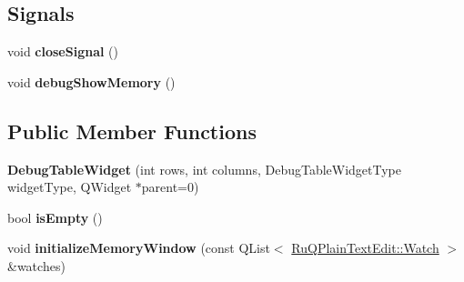 \subsection*{Signals}
\begin{DoxyCompactItemize}
\item 
\hypertarget{class_debug_table_widget_a63febd4042d44b0148fb3e3692d4423b}{}void {\bfseries close\+Signal} ()\label{class_debug_table_widget_a63febd4042d44b0148fb3e3692d4423b}

\item 
\hypertarget{class_debug_table_widget_a4ba5bb4bf0bc8ffac4fa7740cc566dc4}{}void {\bfseries debug\+Show\+Memory} ()\label{class_debug_table_widget_a4ba5bb4bf0bc8ffac4fa7740cc566dc4}

\end{DoxyCompactItemize}
\subsection*{Public Member Functions}
\begin{DoxyCompactItemize}
\item 
\hypertarget{class_debug_table_widget_a72e7b44f66614eb549fe23486c885c57}{}{\bfseries Debug\+Table\+Widget} (int rows, int columns, Debug\+Table\+Widget\+Type widget\+Type, Q\+Widget $\ast$parent=0)\label{class_debug_table_widget_a72e7b44f66614eb549fe23486c885c57}

\item 
\hypertarget{class_debug_table_widget_a9242e8c7c39e7cc52f1689dfabd69285}{}bool {\bfseries is\+Empty} ()\label{class_debug_table_widget_a9242e8c7c39e7cc52f1689dfabd69285}

\item 
\hypertarget{class_debug_table_widget_a4b3a88d8c20725d4515af9222805f7af}{}void {\bfseries initialize\+Memory\+Window} (const Q\+List$<$ \hyperlink{struct_ru_q_plain_text_edit_1_1_watch}{Ru\+Q\+Plain\+Text\+Edit\+::\+Watch} $>$ \&watches)\label{class_debug_table_widget_a4b3a88d8c20725d4515af9222805f7af}

\end{DoxyCompactItemize}
